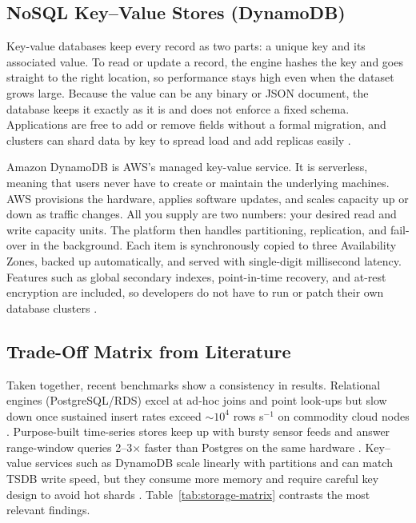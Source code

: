 \documentclass[nomenclature, english, biblatex]{kththesis}
\numberwithin{listing}{chapter}
\begin{document}
\subsection{NoSQL Key–Value Stores (DynamoDB)}
Key-value databases keep every record as two parts: a unique key and its associated value.
To read or update a record, the engine hashes the key and goes straight to the right location, so performance stays high even when the dataset grows large.
Because the value can be any binary or JSON document, the database keeps it exactly as it is and does not enforce a fixed schema.
Applications are free to add or remove fields without a formal migration, and clusters can shard data by key to spread load and add replicas easily \cite[Chs.~2 \& 8]{Sadalage2013NoSQLDistilled}.

Amazon DynamoDB is AWS's managed key-value service.
It is serverless, meaning that users never have to create or maintain the underlying machines.
AWS provisions the hardware, applies software updates, and scales capacity up or down as traffic changes.
All you supply are two numbers: your desired read and write capacity units. 
The platform then handles partitioning, replication, and fail-over in the background.
Each item is synchronously copied to three Availability Zones, backed up automatically, and served with single-digit millisecond latency.
Features such as global secondary indexes, point-in-time recovery, and at-rest encryption are included, so developers do not have to run or patch their own database clusters \cite{AWSDynamoDBDoc}.


\subsection{Trade-Off Matrix from Literature}

Taken together, recent benchmarks show a consistency in results. 
Relational engines (PostgreSQL/RDS) excel at ad-hoc joins and point look-ups but slow down once sustained insert rates exceed \(\sim\!10^{4}\) rows s\(^{-1}\) on commodity cloud nodes \cite{Heldt2021SciTS}. 
Purpose-built time-series stores keep up with bursty sensor feeds and answer
range-window queries 2–3× faster than Postgres on the same hardware
\cite{Grzesik2020EdgeIoTBenchmark,Daqouri2023TimeseriesVsSQL}. 
Key–value services such as DynamoDB scale linearly with partitions and can
match TSDB write speed, but they consume more memory and require careful key
design to avoid hot shards \cite{Vergara2021PerformanceTSDB,Zhang2023EdgeTSDB}.
Table~\ref{tab:storage-matrix} contrasts the most relevant findings.
\end{document}
